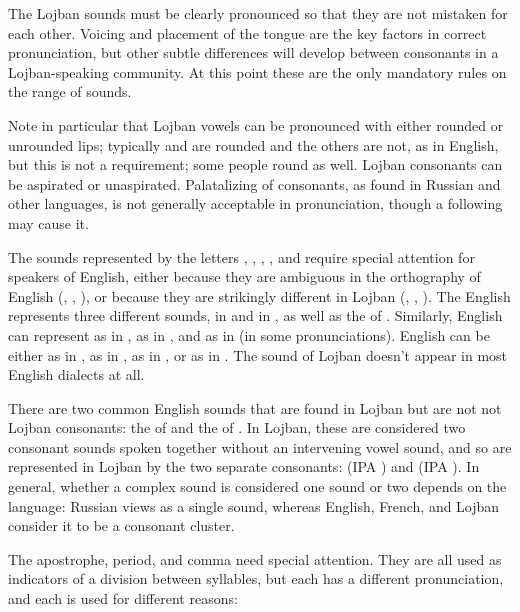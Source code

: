 The Lojban sounds must be clearly pronounced so that they are not mistaken for each other. Voicing and placement of the tongue are the key factors in correct pronunciation, but other subtle differences will develop between consonants in a Lojban-speaking community. At this point these are the only mandatory rules on the range of sounds. 

Note in particular that Lojban vowels can be pronounced with either rounded or unrounded lips; typically  and  are rounded and the others are not, as in English, but this is not a requirement; some people round  as well. Lojban consonants can be aspirated or unaspirated. Palatalizing of consonants, as found in Russian and other languages, is not generally acceptable in pronunciation, though a following  may cause it.

The sounds represented by the letters , , , , and  require special attention for speakers of English, either because they are ambiguous in the orthography of English (, , ), or because they are strikingly different in Lojban (, , ). The English  represents three different sounds,  in  and  in , as well as the  of . Similarly, English  can represent  as in ,  as in , and  as in  (in some pronunciations). English  can be either  as in ,  as in ,  as in , or  as in . The sound of Lojban  doesn't appear in most English dialects at all.

There are two common English sounds that are found in Lojban but are not not Lojban consonants: the  of  and the  of . In Lojban, these are considered two consonant sounds spoken together without an intervening vowel sound, and so are represented in Lojban by the two separate consonants:  (IPA ) and  (IPA ). In general, whether a complex sound is considered one sound or two depends on the language: Russian views  as a single sound, whereas English, French, and Lojban consider it to be a consonant cluster.



The apostrophe, period, and comma need special attention. They are all used as indicators of a division between syllables, but each has a different pronunciation, and each is used for different reasons:

